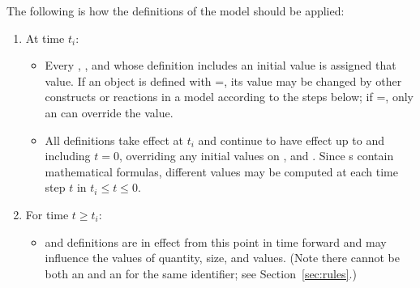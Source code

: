 The following is how the definitions of the model should be
applied:
\begin{enumerate}

\item At time $t_i$:
  \begin{itemize}
    
  \item Every \Species, \Compartment, and \Parameter whose
    definition includes an initial value is assigned that value.
    If an object is defined with =, its
    value may be changed by other constructs or reactions in a
    model according to the steps below; if
    =, only an \InitialAssignment can
    override the value.
    
  \item All \InitialAssignment definitions take effect at $t_i$
    and continue to have effect up to and including $t = 0$,
    overriding any initial values on \Species, \Compartment and
    \Parameter.  Since \InitialAssignment{}s contain mathematical
    formulas, different values may be computed at each time step
    $t$ in $t_i \leq t \leq 0$.


  \end{itemize}
  
\item For time $t \geq t_i$:
  \begin{itemize}
    
  \item \AssignmentRule and \AlgebraicRule definitions are in
    effect from this point in time forward and may influence the
    values of \Species quantity, \Compartment size, and \Parameter
    values.  (Note there cannot be both an \AssignmentRule and an
    \InitialAssignment for the same identifier; see
    Section~\ref{sec:rules}.)

  \end{itemize}
  

\end{enumerate}
